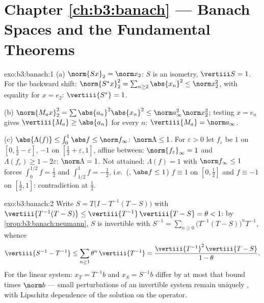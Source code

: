 \section*{Chapter \ref{ch:b3:banach} --- Banach Spaces and the
Fundamental Theorems}

\begin{solution}{exo:b3:banach:1}
(a) $\norm{Sx}_2 = \norm x_2$: $S$ is an isometry, $\vertiii S =
1$. For the backward shift: $\norm{S^*x}_2^2 = \sum_{n \geq
2}\abs{x_n}^2 \leq \norm x_2^2$, with equality for $x = e_2$:
$\vertiii{S^*} = 1$.

(b) $\norm{M_ax}_2^2 = \sum\abs{a_n}^2\abs{x_n}^2 \leq \norm
a_\infty^2\norm x_2^2$; testing $x = e_n$ gives $\vertiii{M_a}
\geq \abs{a_n}$ for every $n$: $\vertiii{M_a} = \norm a_\infty$.

(c) $\abs{\Lambda(f)} \leq \int_0^1\abs f \leq \norm f_\infty$:
$\norm\Lambda \leq 1$. For $\varepsilon > 0$ let $f_\varepsilon$
be $1$ on $[0, \frac12 - \varepsilon]$, $-1$ on $[\frac12 +
\varepsilon, 1]$, affine between: $\norm{f_\varepsilon}_\infty =
1$ and $\Lambda(f_\varepsilon) \geq 1 - 2\varepsilon$:
$\norm\Lambda = 1$. Not attained: $\Lambda(f) = 1$ with $\norm
f_\infty \leq 1$ forces $\int_0^{1/2}f = \frac12$ and
$\int_{1/2}^1 f = -\frac12$, i.e.\ (, $\abs f \leq 1$)
$f \equiv 1$ on $[0, \frac12]$ and $f \equiv -1$ on $[\frac12,
1]$: contradiction at $\frac12$.
\end{solution}

\begin{solution}{exo:b3:banach:2}
Write $S = T\bigl(I - T^{-1}(T - S)\bigr)$ with
$\vertiii{T^{-1}(T-S)} \leq \vertiii{T^{-1}}\,\vertiii{T - S} =
\theta < 1$: by \cref{prop:b3:banach:neumann}, $S$ is invertible
with $S^{-1} = \sum_{n\geq0}\bigl(T^{-1}(T -
S)\bigr)^nT^{-1}$, whence
\[
\vertiii{S^{-1} - T^{-1}} \leq
\sum_{n\geq1}\theta^n\,\vertiii{T^{-1}}
= \frac{\vertiii{T^{-1}}^2\,\vertiii{T - S}}{1 - \theta}.
\]
For the linear system: $x_T = T^{-1}b$ and $x_S = S^{-1}b$
differ by at most that bound times $\norm b$ --- small
perturbations of an invertible system remain uniquely ,
with Lipschitz dependence of the solution on the operator.
\end{solution}


